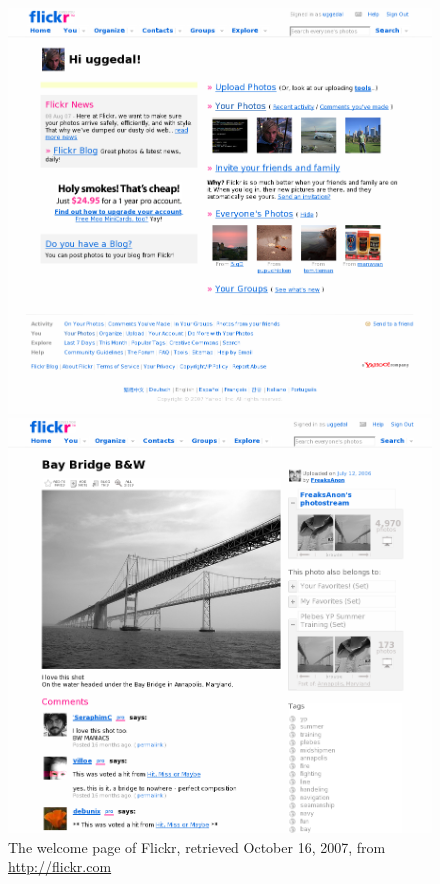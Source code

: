 \begin{figure}
  \captionstyle{\raggedright}
  \begin{whole}
    \begin{minipage}[t]{0.475\wholewidth}
      \includegraphics[width=\textwidth]{scrsh_flickr_welcome}
      \caption[Flickr Welcome Page]{%
         The welcome page of Flickr,
         retrieved October 16, 2007, from \url{http://flickr.com}}
      \label{figure:scrsh.flickr.welcome}
    \end{minipage}
    \hfill
    \begin{minipage}[t]{0.475\wholewidth}
      \includegraphics[width=\textwidth]{scrsh_flickr_photo_detail}

\end{minipage}
\end{whole}
\end{figure}
